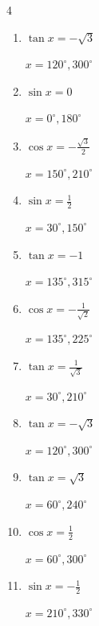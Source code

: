 \begin{multicols}{4}
\begin{enumerate}
        $\displaystyle x = 0^{\circ}$

\columnbreak %

\resetques

  \item $\displaystyle \tan{x}  = -\sqrt{3}$

        $\displaystyle x = 120^{\circ} , 300^{\circ}$

  \item $\displaystyle \sin{x}  = 0$

        $\displaystyle x = 0^{\circ} , 180^{\circ}$

  \item $\displaystyle \cos{x}  = -\frac{\sqrt{3}}{2}$

        $\displaystyle x = 150^{\circ} , 210^{\circ}$

  \item $\displaystyle \sin{x}  = \frac{1}{2}$

        $\displaystyle x = 30^{\circ} , 150^{\circ}$

  \item $\displaystyle \tan{x}  = -1$

        $\displaystyle x = 135^{\circ} , 315^{\circ}$

  \item $\displaystyle \cos{x}  = -\frac{1}{\sqrt{2}}$

        $\displaystyle x = 135^{\circ} , 225^{\circ}$

  \item $\displaystyle \tan{x}  = \frac{1}{\sqrt{3}}$

        $\displaystyle x = 30^{\circ} , 210^{\circ}$

  \item $\displaystyle \tan{x}  = -\sqrt{3}$

        $\displaystyle x = 120^{\circ} , 300^{\circ}$

  \item $\displaystyle \tan{x}  = \sqrt{3}$

        $\displaystyle x = 60^{\circ} , 240^{\circ}$

  \item $\displaystyle \cos{x}  = \frac{1}{2}$

        $\displaystyle x = 60^{\circ} , 300^{\circ}$

  \item $\displaystyle \sin{x}  = -\frac{1}{2}$

        $\displaystyle x = 210^{\circ} , 330^{\circ}$


\end{enumerate}
\end{multicols}

